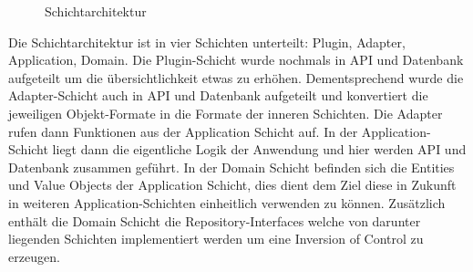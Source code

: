 \begin{figure}[htbp]
    \centering
    \caption{\label{flutter-1} Schichtarchitektur}
\end{figure}
Die Schichtarchitektur ist in vier Schichten unterteilt: Plugin, Adapter, Application, Domain.
Die Plugin-Schicht wurde nochmals in API und Datenbank aufgeteilt um die übersichtlichkeit etwas zu erhöhen.
Dementsprechend wurde die Adapter-Schicht auch in API und Datenbank aufgeteilt und konvertiert die jeweiligen Objekt-Formate in die Formate der inneren Schichten.
Die Adapter rufen dann Funktionen aus der Application Schicht auf.
In der Application-Schicht liegt dann die eigentliche Logik der Anwendung und hier werden API und Datenbank zusammen geführt.
In der Domain Schicht befinden sich die Entities und Value Objects der Application Schicht,
dies dient dem Ziel diese in Zukunft in weiteren Application-Schichten einheitlich verwenden zu können.
Zusätzlich enthält die Domain Schicht die Repository-Interfaces welche von darunter liegenden Schichten implementiert werden um eine Inversion of Control zu erzeugen.
